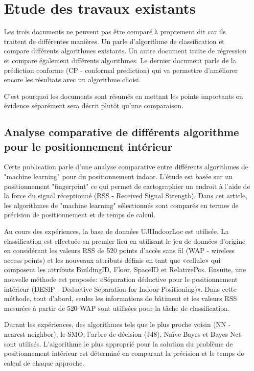 \section{Etude des travaux existants}
Les trois documents ne peuvent pas être comparé à proprement dit car ils traitent de différentes manières. Un parle d'algorithme de classification et compare différents algorithmes existants. Un autre document traite de régression et compare également différents algorithmes. Le dernier document parle de la prédiction conforme (CP - conformal prediction) qui va permettre d'améliorer encore les résultats avec un algorithme choisi.  

C'est pourquoi les documents sont résumés en mettant les points importants en évidence séparément sera décrit plutôt qu'une comparaison. 

\subsection{Analyse comparative de différents algorithme pour le positionnement intérieur \cite{ML_algo}}
Cette publication parle d'une analyse comparative entre différents algorithmes de "machine learning" pour du positionnement indoor. L'étude est basée sur un positionnement "fingerprint" ce qui permet de cartographier un endroit à l'aide de la force du signal réceptionné (RSS - Received Signal Strength).
Dans cet article, les algorithmes de "machine learning" sélectionnés sont comparés en termes de précision de positionnement et de temps de calcul. 

Au cours des expériences, la base de données UJIIndoorLoc est utilisée. La classification est effectuée en premier lieu en utilisant le jeu de données d'origine en considérant les valeurs RSS de 520 points d'accès sans fil (WAP - wireless access points) et les nouveaux attributs définis en tant que «cellule» qui composent les attributs BuildingID, Floor, SpaceID et RelativePos. Ensuite, une nouvelle méthode est proposée: «Séparation déductive pour le positionnement intérieur (DESIP - Deductive Separation for Indoor Positioning)». Dans cette méthode, tout d'abord, seules les informations de bâtiment et les valeurs RSS mesurées à partir de 520 WAP sont utilisées pour la tâche de classification.

Durant les expériences, des algorithmes tels que le plus proche voisin (NN - nearest neighbor), le SMO, l'arbre de décision (J48), Naïve Bayes et Bayes Net sont utilisés. L’algorithme le plus approprié pour la solution du problème de positionnement intérieur est déterminé en comparant la précision et le temps de calcul de chaque approche.

